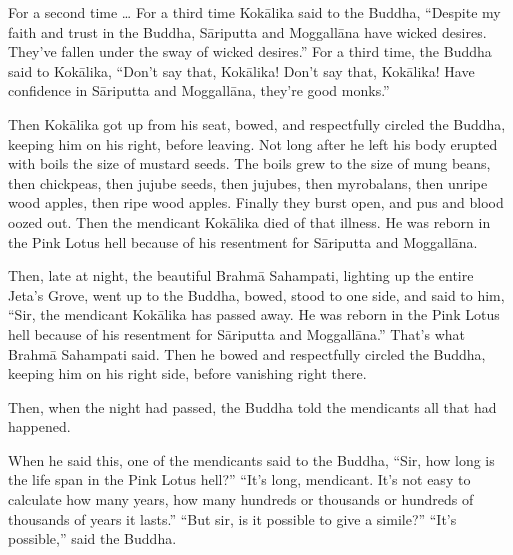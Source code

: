\documentclass[12pt,openany]{book}%
\begin{document}
For a second time … For a third time \textsanskrit{Kokālika} said to the Buddha, “Despite my faith and trust in the Buddha, \textsanskrit{Sāriputta} and \textsanskrit{Moggallāna} have wicked desires. They’ve fallen under the sway of wicked desires.” For a third time, the Buddha said to \textsanskrit{Kokālika}, “Don’t say that, \textsanskrit{Kokālika}! Don’t say that, \textsanskrit{Kokālika}! Have confidence in \textsanskrit{Sāriputta} and \textsanskrit{Moggallāna}, they’re good monks.” 

Then \textsanskrit{Kokālika} got up from his seat, bowed, and respectfully circled the Buddha, keeping him on his right, before leaving. Not long after he left his body erupted with boils the size of mustard seeds. The boils grew to the size of mung beans, then chickpeas, then jujube seeds, then jujubes, then myrobalans, then unripe wood apples, then ripe wood apples. Finally they burst open, and pus and blood oozed out. Then the mendicant \textsanskrit{Kokālika} died of that illness. He was reborn in the Pink Lotus hell because of his resentment for \textsanskrit{Sāriputta} and \textsanskrit{Moggallāna}. 

Then, late at night, the beautiful \textsanskrit{Brahmā} Sahampati, lighting up the entire Jeta’s Grove, went up to the Buddha, bowed, stood to one side, and said to him, “Sir, the mendicant \textsanskrit{Kokālika} has passed away. He was reborn in the Pink Lotus hell because of his resentment for \textsanskrit{Sāriputta} and \textsanskrit{Moggallāna}.” That’s what \textsanskrit{Brahmā} Sahampati said. Then he bowed and respectfully circled the Buddha, keeping him on his right side, before vanishing right there. 

Then, when the night had passed, the Buddha told the mendicants all that had happened. 

When he said this, one of the mendicants said to the Buddha, “Sir, how long is the life span in the Pink Lotus hell?” “It’s long, mendicant. It’s not easy to calculate how many years, how many hundreds or thousands or hundreds of thousands of years it lasts.” “But sir, is it possible to give a simile?” “It’s possible,” said the Buddha. 
\end{document}
